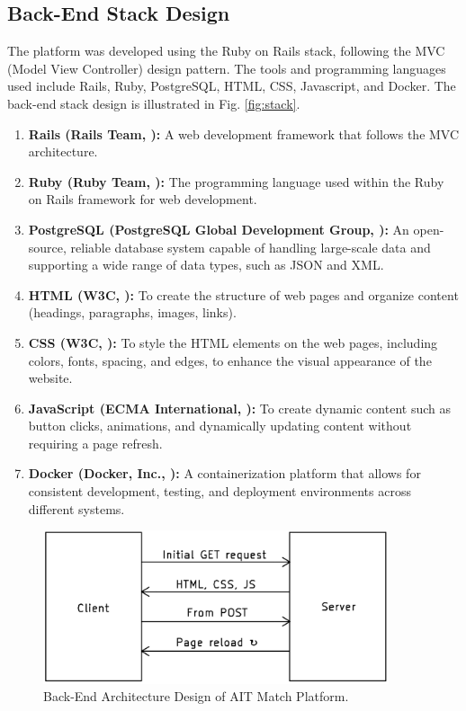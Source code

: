     \subsection{Back-End Stack Design}
        The platform was developed using the Ruby on Rails stack, following the MVC (Model View Controller) design pattern. The tools and programming languages used include Rails, Ruby, PostgreSQL, HTML, CSS, Javascript, and Docker. The back-end stack design is illustrated in Fig. \ref{fig:stack}.
        \begin{enumerate}
            \item \textbf{Rails (Rails Team, \citeyear{rails2024}):} A web development framework that follows the MVC architecture. 
            \item \textbf{Ruby (Ruby Team, \citeyear{ruby2024}):} The programming language used within the Ruby on Rails framework for web development.
            \item \textbf{PostgreSQL (PostgreSQL Global Development Group, \citeyear{postgresql2024}):} An open-source, reliable database system capable of handling large-scale data and supporting a wide range of data types, such as JSON and XML.
            \item \textbf{HTML (W3C, \citeyear{html2024}):} To create the structure of web pages and organize content (headings, paragraphs, images, links).
            \item \textbf{CSS (W3C, \citeyear{css2024}):} To style the HTML elements on the web pages, including colors, fonts, spacing, and edges, to enhance the visual appearance of the website.
            \item \textbf{JavaScript (ECMA International, \citeyear{javascript2024}):} To create dynamic content such as button clicks, animations, and dynamically updating content without requiring a page refresh.
            \item \textbf{Docker (Docker, Inc., \citeyear{docker2024}):} A containerization platform that allows for consistent development, testing, and deployment environments across different systems. \newline
        \end{enumerate} 
        
        \begin{figure}[h]
            \centering
            \captionsetup{justification=centering, singlelinecheck=false, labelsep=space}
            \includegraphics[width=4in]{figures/kicad-mpa-architect.png} %
            \caption{Back-End Architecture Design of AIT Match Platform.}
            \label{fig:mpa}
        \end{figure}
        
